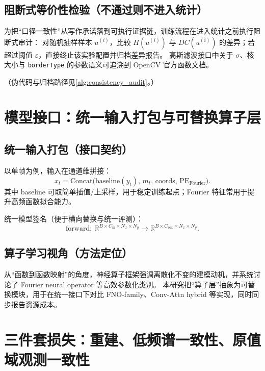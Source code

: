 \subsection{阻断式等价性检验（不通过则不进入统计）}
\label{subsec:blocking_audit}

为把“口径一致性”从写作承诺落到可执行证据链，训练流程在进入统计之前执行阻断式审计：
对随机抽样样本 $u^{(i)}$，比较 $H(u^{(i)})$ 与 $DC(u^{(i)})$ 的差异；若超过阈值 $\varepsilon$，直接终止该实验配置并归档差异报告。
高斯滤波接口中关于 $\sigma$、核大小与 \texttt{borderType} 的参数语义可追溯到 OpenCV 官方函数文档。

（伪代码与归档路径见\autoref{alg:consistency_audit}。）

\section{模型接口：统一输入打包与可替换算子层}
\label{sec:model_interface}

\subsection{统一输入打包（接口契约）}
\label{subsec:input_pack}

以单帧为例，输入在通道维拼接：
\begin{equation}
x_t=\mathrm{Concat}\big(\mathrm{baseline}(y_t),\, m_t,\, \mathrm{coords},\, \mathrm{PE}_{\mathrm{Fourier}}\big).
\end{equation}
其中 baseline 可取简单插值/上采样，用于稳定训练起点；Fourier 特征常用于提升高频函数拟合能力。

统一模型签名（便于横向替换与统一评测）：
\begin{equation}
\mathrm{forward}:\ \mathbb{R}^{B\times C_{\mathrm{in}}\times N_x\times N_y}\rightarrow
\mathbb{R}^{B\times C_{\mathrm{out}}\times N_x\times N_y}.
\end{equation}

\subsection{算子学习视角（方法定位）}
\label{subsec:operator_view}

从“函数到函数映射”的角度，神经算子框架强调离散化不变的建模动机，并系统讨论了 Fourier neural operator 等高效参数化类别。
本研究把“算子层”抽象为可替换模块，用于在统一接口下对比 FNO-family、Conv-Attn hybrid 等实现，同时同步报告资源成本。

\section{三件套损失：重建、低频谱一致性、原值域观测一致性}
\label{sec:losses}

